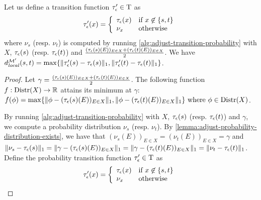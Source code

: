 \begin{lemma}\label{lemma:local-bisimilarity-distances-witness-transition-funciton}
Let us define a transition function $\tau_{\epsilon}' \in {\rm T}$ as 
\[
	\tau_{\epsilon}'(x) = \left \{
	\begin{array}{ll}
	\tau_{\epsilon}(x)& \mbox{if $x \not\in \{s, t\}$}\\
	\nu_x & \mbox{otherwise}
	\end{array}
	\right .
\]
where $\nu_s$ (resp. $\nu_t$) is computed by running \cref{alg:adjust-transition-probability} with $X$, $\tau_{\epsilon}(s)$ (resp. $\tau_{\epsilon}(t)$) and $\frac{(\tau_{\epsilon}(s)(E))_{E \in X} + (\tau_{\epsilon}(t)(E))_{E \in X}}{2}$. We have $d_{\mathit{local}}^{\mathcal{M}'}(s, t) = \max\{\|\tau_{\epsilon}'(s) - \tau_{\epsilon}(s)\|_1, \|\tau_{\epsilon}'(t) - \tau_{\epsilon}(t)\|_1 \} $. 
\end{lemma}
\begin{proof}
	Let $\gamma = \frac{(\tau_{\epsilon}(s)(E))_{E \in X} + (\tau_{\epsilon}(t)(E))_{E \in X}}{2}$. The following function $f: \mathrm{Distr}(X) \to \mathbb{R}$ attains its minimum at $\gamma$: $f(\phi) = \max\{\|\phi - (\tau_{\epsilon}(s)(E))_{E \in X}\|_1, \|\phi - (\tau_{\epsilon}(t)(E))_{E \in X}\|_1\} \text{ where } \phi \in \mathrm{Distr}(X)$.

By running \cref{alg:adjust-transition-probability} with $X$, $\tau_{\epsilon}(s)$ (resp. $\tau_{\epsilon}(t)$) and $\gamma$, we compute a probability distribution $\nu_s$ (resp. $\nu_t$). By \cref{lemma:adjust-probability-distribution-exists}, we have that $(\nu_s(E))_{E \in X} = (\nu_t(E))_{E \in X}  = \gamma$ and $\|\nu_s - \tau_{\epsilon}(s)\|_1 = \|\gamma - (\tau_{\epsilon}(s)(E))_{E \in  X}\|_1 = \|\gamma - (\tau_{\epsilon}(t)(E))_{E \in  X}\|_1 = \|\nu_t - \tau_{\epsilon}(t)\|_1$. Define the probability transition function $\tau_{\epsilon}' \in {\rm T}$ as 	
\[
\tau_{\epsilon}'(x) = \left \{
\begin{array}{ll}
\tau_{\epsilon}(x)& \mbox{if $x \not\in \{s, t\}$}\\
\nu_x & \mbox{otherwise}
\end{array}
\right .
\]


\end{proof}
